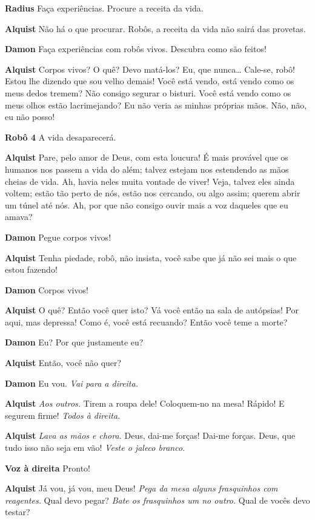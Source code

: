 \textbf{Radius} Faça experiências. Procure a receita da vida.

\textbf{Alquist} Não há o que procurar. Robôs, a receita da vida não sairá das provetas.

\textbf{Damon} Faça experiências com robôs vivos. Descubra como são feitos!

\textbf{Alquist} Corpos vivos? O quê? Devo matá-los? Eu, que nunca\ldots{} Cale-se,
robô! Estou lhe dizendo que sou velho demais! Você está vendo, está vendo como os
meus dedos tremem? Não consigo segurar o bisturi. Você está vendo como os meus
olhos estão lacrimejando? Eu não veria as minhas próprias mãos. Não, não, eu não
posso!

\textbf{Robô 4} A vida desaparecerá.

\textbf{Alquist} Pare, pelo amor de Deus, com esta loucura! É mais provável que os
humanos nos passem a vida do além; talvez estejam nos estendendo as mãos cheias
de vida. Ah, havia neles muita vontade de viver! Veja, talvez eles ainda voltem;
estão tão perto de nós, estão nos cercando, ou algo assim; querem abrir um túnel
até nós. Ah, por que não consigo ouvir mais a voz daqueles que eu amava?

\textbf{Damon} Pegue corpos vivos!

\textbf{Alquist} Tenha piedade, robô, não insista, você sabe que já não
sei mais o que estou fazendo!

\textbf{Damon} Corpos vivos!

\textbf{Alquist} O quê? Então você quer isto? Vá você então na sala de autópsias!
Por aqui, mas depressa! Como é, você está recuando? Então você teme a
morte?

\textbf{Damon} Eu? Por que justamente eu?

\textbf{Alquist} Então, você não quer?

\textbf{Damon} Eu vou. \emph{Vai para a direita.}

\textbf{Alquist} \emph{Aos outros.} Tirem a roupa dele! Coloquem-no na mesa! Rápido! E
segurem firme!
\emph{Todos à direita.}

\textbf{Alquist} \emph{Lava as mãos e chora.}  Deus, dai-me forças! Dai-me
forças. Deus, que tudo isso não seja em vão! \emph{Veste o jaleco branco.}

\textbf{Voz à direita} Pronto!

\textbf{Alquist} Já vou, já vou, meu Deus! \emph{Pega da mesa alguns frasquinhos com
reagentes.} Qual devo pegar? \emph{Bate os frasquinhos um no outro.} Qual de
vocês devo testar?

